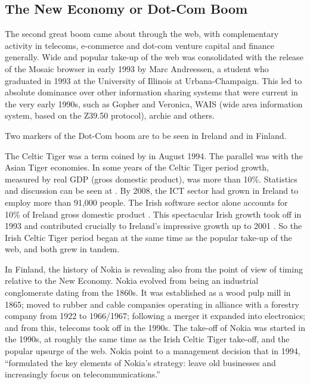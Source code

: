 \documentclass{article}
\begin{document}
\subsection{The New Economy or Dot-Com Boom}

The second great boom came about through the web, with 
complementary activity in 
telecoms, e-commerce and dot-com venture capital and finance
generally.  Wide and popular 
take-up of the web was consolidated with the 
release of the Mosaic browser in early 1993 by Marc Andreessen, 
a student who  
graduated in 1993 at the University of Illinois at Urbana-Champaign.  
This led to 
absolute dominance over other information sharing systems that were 
current in the 
very early 1990s, such as Gopher and Veronica, WAIS
(wide area information system, based on the Z39.50 protocol), 
archie and others.  

Two markers of the Dot-Com boom are to be seen in Ireland and in Finland.

The Celtic Tiger \cite{oriain}
was a term coined by \cite{gardiner} in August 1994. 
The parallel was with the Asian Tiger economies.  
In some years of the Celtic Tiger period growth, 
measured by real GDP (gross domestic product), was more 
than 10\%.  Statistics and discussion can be seen at \cite{esri}.
By 2008, the ICT sector had grown in Ireland to employ more than 
91,000 people.  The Irish software sector alone accounts for
10\% of Ireland gross domestic product \cite{kevinryan}.    
This spectacular Irish growth took off in 1993 and contributed 
crucially to Ireland's impressive growth up to 2001 \cite{fitzgerald}.  
So the 
Irish Celtic Tiger period began at the same time as the popular 
take-up of the web, and both grew in tandem.  

In Finland, the history of Nokia is revealing also from the point 
of view of timing relative to the New Economy.  Nokia evolved from being an 
industrial conglomerate   dating from the 1860s.  It was  
established as a wood pulp mill in 1865; moved to rubber and cable companies 
operating in 
alliance with a forestry company from 1922 to 1966/1967; following 
a merger it 
expanded into electronics; and from this, telecoms took off in the 1990s.
The take-off of 
Nokia was started in the 1990s, at roughly the same time as the
Irish Celtic Tiger take-off, and the popular upsurge of the web.  Nokia
point to a management decision that in 1994,   ``formulated the key elements of 
Nokia's strategy: leave old businesses and increasingly focus on 
telecommunications.''
\end{document}

